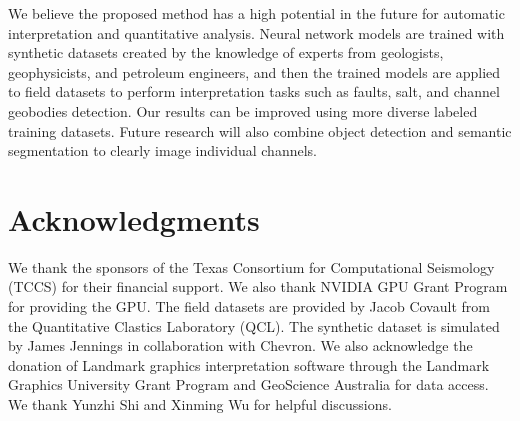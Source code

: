 We believe the proposed method has a high potential in the future for automatic interpretation and quantitative analysis. Neural network models are trained with synthetic datasets created by the knowledge of experts from geologists, geophysicists, and petroleum engineers, and then the trained models are applied to field datasets to perform interpretation tasks such as faults, salt, and channel geobodies detection. Our results can be improved using more diverse labeled training datasets. Future research will also combine object detection and semantic segmentation to clearly image individual channels.                

\section{Acknowledgments}
We thank the sponsors of the Texas Consortium for Computational Seismology (TCCS) for their financial support. We also thank NVIDIA GPU Grant Program for providing the GPU. The field datasets are provided by Jacob Covault from the Quantitative Clastics Laboratory (QCL). The synthetic dataset is simulated by James Jennings in collaboration with Chevron. We also acknowledge the donation of Landmark graphics interpretation software through the Landmark Graphics University Grant Program and GeoScience Australia for data access. We thank Yunzhi Shi and Xinming Wu for helpful discussions. 



